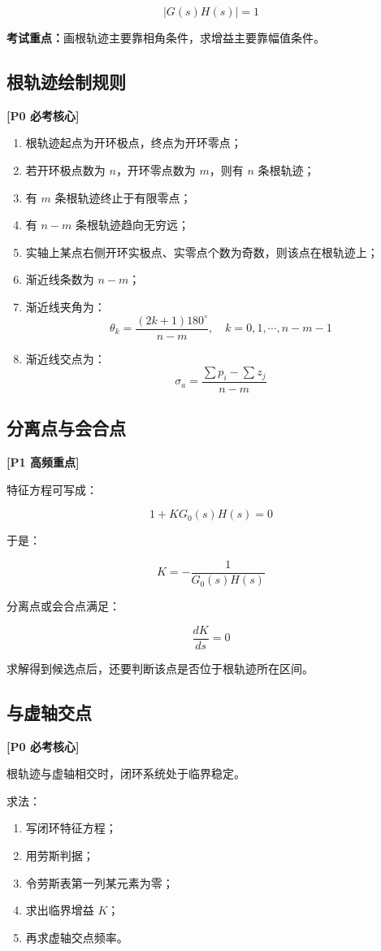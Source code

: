 \documentclass[UTF8,a4paper,12pt]{ctexart}
\newcommand{\Pzero}{\textcolor{p0}{\textbf{[P0 必考核心]}}}
\newcommand{\Pone}{\textcolor{p1}{\textbf{[P1 高频重点]}}}
\newcommand{\exam}{\textcolor{p0}{\textbf{考试重点：}}}
\begin{document}
\[
|G(s)H(s)|=1
\]

\exam 画根轨迹主要靠相角条件，求增益主要靠幅值条件。

\subsection{根轨迹绘制规则}

\Pzero

\begin{enumerate}
    \item 根轨迹起点为开环极点，终点为开环零点；
    \item 若开环极点数为 $n$，开环零点数为 $m$，则有 $n$ 条根轨迹；
    \item 有 $m$ 条根轨迹终止于有限零点；
    \item 有 $n-m$ 条根轨迹趋向无穷远；
    \item 实轴上某点右侧开环实极点、实零点个数为奇数，则该点在根轨迹上；
    \item 渐近线条数为 $n-m$；
    \item 渐近线夹角为：
    \[
    \theta_k=\frac{(2k+1)180^\circ}{n-m},\quad k=0,1,\cdots,n-m-1
    \]
    \item 渐近线交点为：
    \[
    \sigma_a=\frac{\sum p_i-\sum z_j}{n-m}
    \]
\end{enumerate}

\subsection{分离点与会合点}

\Pone

特征方程可写成：

\[
1+KG_0(s)H(s)=0
\]

于是：

\[
K=-\frac{1}{G_0(s)H(s)}
\]

分离点或会合点满足：

\[
\frac{dK}{ds}=0
\]

求解得到候选点后，还要判断该点是否位于根轨迹所在区间。

\subsection{与虚轴交点}

\Pzero

根轨迹与虚轴相交时，闭环系统处于临界稳定。

求法：

\begin{enumerate}
    \item 写闭环特征方程；
    \item 用劳斯判据；
    \item 令劳斯表第一列某元素为零；
    \item 求出临界增益 $K$；
    \item 再求虚轴交点频率。
\end{enumerate}
\end{document}
